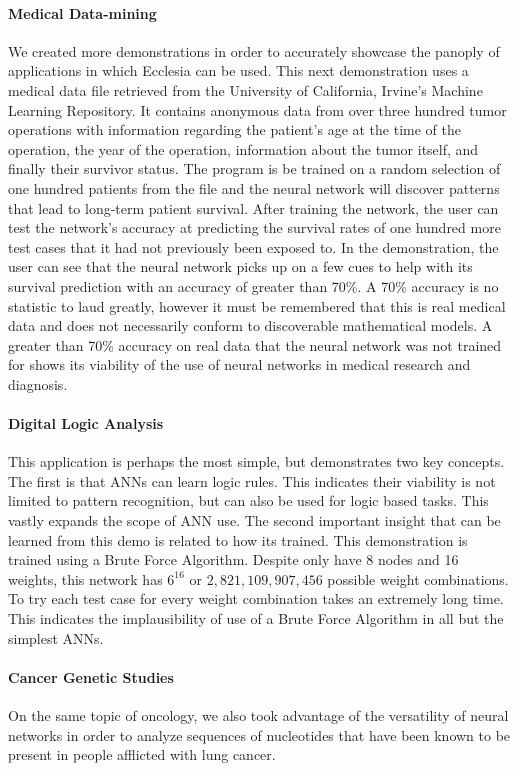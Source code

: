 \documentclass[letterpaper, 10pt]{article}
\begin{document}
		\paragraph{Medical Data-mining}
		We created more demonstrations in order to accurately showcase the panoply of applications in which Ecclesia can be used. This next demonstration uses a medical data file retrieved from the University of California, Irvine's Machine Learning Repository. It contains anonymous data from over three hundred tumor operations with information regarding the patient's age at the time of the operation, the year of the operation, information about the tumor itself, and finally their survivor status. The program is be trained on a random selection of one hundred patients from the file and the neural network will discover patterns that lead to long-term patient survival. After training the network, the user can test the network's accuracy at predicting the survival rates of one hundred more test cases that it had not previously been exposed to. In the demonstration, the user can see that the neural network picks up on a few cues to help with its survival prediction with an accuracy of greater than 70\%. A 70\% accuracy is no statistic to laud greatly, however it must be remembered that this is real medical data and does not necessarily conform to discoverable mathematical models. A greater than 70\% accuracy on real data that the neural network was not trained for shows its viability of the use of neural networks in medical research and diagnosis.
		
		\paragraph{Digital Logic Analysis}
		This application is perhaps the most simple, but demonstrates two key concepts. The first is that ANNs can learn logic rules. This indicates their viability is not limited to pattern recognition, but can also be used for logic based tasks. This vastly expands the scope of ANN use. The second important insight that can be learned from this demo is related to how its trained. This demonstration is trained using a Brute Force Algorithm. Despite only have 8 nodes and 16 weights, this network has $6^{16}$ or $2,821,109,907,456$ possible weight combinations. To try each test case for every weight combination takes an extremely long time. This indicates the implausibility of use of a Brute Force Algorithm in all but the simplest ANNs.
		
		\paragraph{Cancer Genetic Studies}
		On the same topic of oncology, we also took advantage of the versatility of neural networks in order to analyze sequences of nucleotides that have been known to be present in people afflicted with lung cancer. 
		
\end{document}
